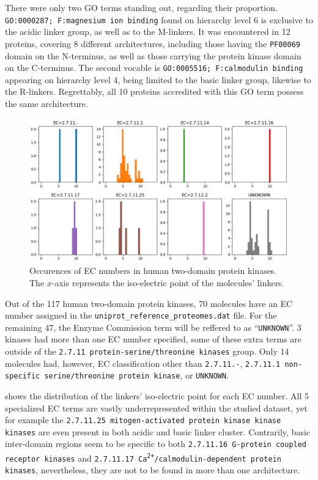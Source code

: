 		There were only two GO terms standing out, regarding their proportion.
		\texttt{GO:0000287; F:magnesium ion binding} found on hierarchy level 6 is exclusive
		to the acidic linker group, as well as to the M-linkers.
		It was encountered in 12 proteins, covering 8 different architectures, including those
		having the \texttt{PF00069} domain on the N-terminus, as well as those carrying the
		protein kinase domain on the C-terminus.
		The second vocable is \texttt{GO:0005516; F:calmodulin binding} appearing on hierarchy
		level 4, being limited to the basic linker group, likewise to the R-linkers.
		Regrettably, all 10 proteins accredited with this GO term possess the same
		architecture.

	\label{res:first:ec}

		\begin{figure}
			\centering
			\includegraphics[width=\linewidth]{img/iso_density_ec.png}
			\caption{Occurences of EC numbers in human two-domain protein kinases. The $x$-axis
			represents the iso-electric point of the molecules' linkers.}
			\label{fig:ec}
		\end{figure}

		Out of the 117 human two-domain protein kinases, 70 molecules have an EC number
		assigned in the \texttt{uniprot\_reference\_proteomes.dat} file.
		For the remaining 47, the Enzyme Commission term will be reffered to as
		``\texttt{UNKNOWN}''.
		3 kinases had more than one EC number specified, some of these extra terms are
		outside of the \texttt{2.7.11 protein-serine/threonine kinases} group.
		Only 14 molecules had, however, EC classification other than \texttt{2.7.11.-},
		\texttt{2.7.11.1 non-specific serine/threonine protein kinase}, or \texttt{UNKNOWN}.

		 shows the distribution of the linkers' iso-electric point for each EC
		number.
		All 5 specialized EC terms are vastly underrepresented within the studied dataset, yet
		for example the \texttt{2.7.11.25 mitogen-activated protein kinase kinase kinases}
		are even present in both acidic and basic linker cluster.
		Contrarily, basic inter-domain regions seem to be specific to both \texttt{2.7.11.16
		G-protein coupled receptor kinases} and
		\texttt{2.7.11.17 Ca\textsuperscript{2+}/calmodulin-dependent protein kinases},
		nevertheless, they are not to be found in more than one architecture.

